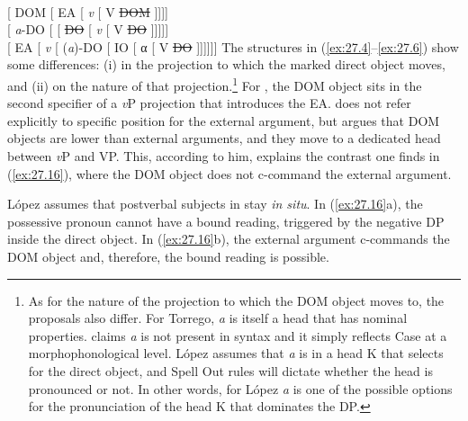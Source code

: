 \documentclass[output=paper]{langsci/langscibook}
\begin{document}
\ea\label{ex:27.13} \citet{Torrego1998}\\
    {}[ DOM [
    \gls{EA} [  \emph{v}   [  V  \sout{DOM} ]]]]
\ex\label{ex:27.14} \citet{Rodriguez-Mondonedo2007}\\ {}[
\emph{a}-\gls{DO} [  \Dat{} [ \sout{\gls{DO}}
[ \emph{v} [ V \sout{\gls{DO}} ]]]]]
\ex\label{ex:27.15} \citet{Lopez2012}\\
{}[ \gls{EA} [ \emph{v} [
(\emph{a})-\gls{DO} [ \gls{IO} [ α [ V \sout{\gls{DO}} ]]]]]]
\z
The structures in (\ref{ex:27.4}--\ref{ex:27.6}) show some
differences: (i) in the projection to which the marked direct object moves, and
(ii) on the nature of that projection.\footnote{As for the nature of the
    projection to which the DOM object moves
    to, the proposals also differ. For Torrego, \emph{a} is itself a head that
    has nominal properties.  \citeauthor{Rodriguez-Mondonedo2007} claims
    \emph{a} is not present in syntax and it simply reflects Case at a
    morphophonological level.  López assumes that \emph{a} is in a head K that
selects for the direct object, and Spell Out rules will dictate whether the
head is pronounced or not.  In other words, for López \emph{a} is one of the
possible options for the pronunciation of the head K that dominates the DP\@.}
For \citet{Torrego1998}, the DOM object sits in
the second specifier of a \emph{v}P projection that introduces the \gls{EA}.
\textcite{Rodriguez-Mondonedo2007} does not refer explicitly to specific
position for the external argument, but \textcite{Lopez2012} argues that
DOM objects are lower than external arguments,
and they move to a dedicated head between \emph{v}P and VP\@. This, according
to him, explains the contrast one finds in (\ref{ex:27.16}), where the
DOM object does not c-command the external
argument.

\ea\label{ex:27.16} 
    \z
\z
López assumes that postverbal subjects in  stay \emph{in situ}. In
(\ref{ex:27.16}a), the possessive pronoun cannot have a bound reading,
triggered by the negative DP inside the direct object. In (\ref{ex:27.16}b),
the external argument c-commands the DOM object and, therefore, the bound
reading is possible.
\end{document}
